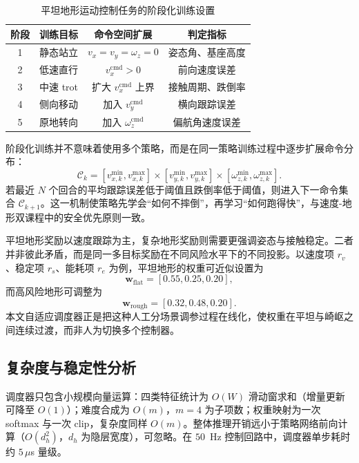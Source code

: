 \documentclass[12pt,a4paper]{ctexart}
\numberwithin{equation}{section}
\numberwithin{table}{section}
\numberwithin{figure}{section}
\newcommand{\subtopic}[1]{\par\addvspace{0.2\baselineskip}\ignorespaces}
\begin{document}
\begin{table}[H]
\centering
\caption{平坦地形运动控制任务的阶段化训练设置}
\label{tab:flat_stage}
\small
\begin{tabular}{clcc}
\toprule
阶段 & 训练目标 & 命令空间扩展 & 判定指标 \\
\midrule
1 & 静态站立 & $v_x=v_y=\omega_z=0$ & 姿态角、基座高度 \\
2 & 低速直行 & $v_x^{\text{cmd}}>0$ & 前向速度误差 \\
3 & 中速 trot & 扩大 $v_x^{\text{cmd}}$ 上界 & 接触周期、跌倒率 \\
4 & 侧向移动 & 加入 $v_y^{\text{cmd}}$ & 横向跟踪误差 \\
5 & 原地转向 & 加入 $\omega_z^{\text{cmd}}$ & 偏航角速度误差 \\
\bottomrule
\end{tabular}
\end{table}

阶段化训练并不意味着使用多个策略，而是在同一策略训练过程中逐步扩展命令分布：
\begin{equation}
\mathcal{C}_k=[v_{x,k}^{\min},v_{x,k}^{\max}]\times[v_{y,k}^{\min},v_{y,k}^{\max}]\times[\omega_{z,k}^{\min},\omega_{z,k}^{\max}].
\end{equation}
若最近 $N$ 个回合的平均跟踪误差低于阈值且跌倒率低于阈值，则进入下一命令集合 $\mathcal{C}_{k+1}$。这一机制使策略先学会“如何不摔倒”，再学习“如何跑得快”，与速度-地形双课程中的安全优先原则一致。

\subtopic{平坦地形与复杂地形的奖励差异}
平坦地形奖励以速度跟踪为主，复杂地形奖励则需要更强调姿态与接触稳定。二者并非彼此矛盾，而是同一多目标奖励在不同风险水平下的不同投影。以速度项 $r_v$、稳定项 $r_s$、能耗项 $r_e$ 为例，平坦地形的权重可近似设置为
\begin{equation}
\bm{w}_{\text{flat}}=[0.55,0.25,0.20],
\end{equation}
而高风险地形可调整为
\begin{equation}
\bm{w}_{\text{rough}}=[0.32,0.48,0.20].
\end{equation}
本文自适应调度器正是把这种人工分场景调参过程在线化，使权重在平坦与崎岖之间连续过渡，而非人为切换多个控制器。

\subsection{复杂度与稳定性分析}
\subtopic{计算复杂度}
调度器只包含小规模向量运算：四类特征统计为 $O(W)$ 滑动窗求和（增量更新可降至 $O(1)$）；难度合成为 $O(m)$，$m=4$ 为子项数；权重映射为一次 softmax 与一次 clip，复杂度同样 $O(m)$。整体推理开销远小于策略网络前向计算（$O(d_h^2)$，$d_h$ 为隐层宽度），可忽略。在 $50$~Hz 控制回路中，调度器单步耗时约 $5\,\mu$s 量级。
\end{document}
